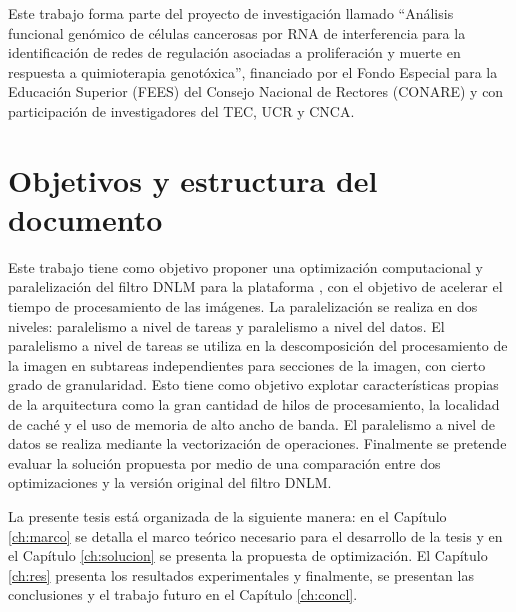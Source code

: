 Este trabajo forma parte del proyecto de investigaci\'on llamado ``Análisis funcional genómico de células cancerosas por RNA de interferencia para la identificación de redes de regulación asociadas a proliferación y muerte en respuesta a quimioterapia genotóxica'', financiado por el Fondo Especial para la Educaci\'on Superior (FEES) del Consejo Nacional de Rectores (CONARE) y con participaci\'on de investigadores del TEC, UCR y CNCA. 


\section{Objetivos y estructura del documento}


Este trabajo tiene como objetivo proponer una optimizaci\'on computacional y paralelizaci\'on del filtro DNLM  para la plataforma , con el objetivo de acelerar el tiempo de procesamiento de las im\'agenes. La paralelizaci\'on se realiza en dos niveles: paralelismo a nivel de tareas y paralelismo a nivel del datos. El paralelismo a nivel de tareas se utiliza en la descomposici\'on del procesamiento de la imagen en subtareas independientes para secciones de la imagen, con cierto grado de granularidad. Esto tiene como objetivo explotar caracter\'isticas propias de la arquitectura como la gran cantidad de hilos de procesamiento, la localidad de cach\'e y el uso de memoria de alto ancho de banda. El paralelismo a nivel de datos se realiza mediante la vectorizaci\'on de operaciones. Finalmente se pretende evaluar la soluci\'on propuesta por medio de una comparaci\'on entre dos optimizaciones y la versi\'on original del filtro DNLM.


La presente tesis est\'a organizada de la siguiente manera: en el Cap\'itulo \ref{ch:marco} se detalla el marco te\'orico necesario para el desarrollo de la tesis y en el Cap\'itulo \ref{ch:solucion} se presenta la propuesta de optimizaci\'on. El Cap\'itulo \ref{ch:res} presenta los resultados experimentales y finalmente, se presentan las conclusiones y el trabajo futuro en el Cap\'itulo \ref{ch:concl}. 
